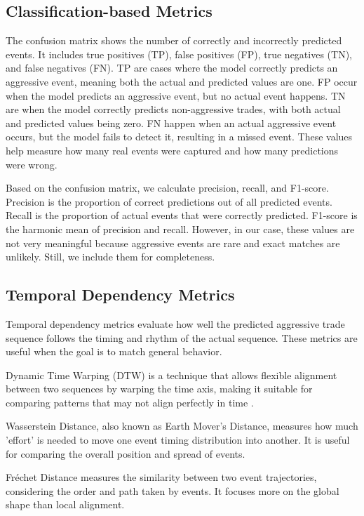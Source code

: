 \subsection{Classification-based Metrics}
The confusion matrix shows the number of correctly and incorrectly predicted events. It includes true positives (TP), false positives (FP), true negatives (TN), and false negatives (FN). TP are cases where the model correctly predicts an aggressive event, meaning both the actual and predicted values are one. FP occur when the model predicts an aggressive event, but no actual event happens. TN are when the model correctly predicts non-aggressive trades, with both actual and predicted values being zero. FN happen when an actual aggressive event occurs, but the model fails to detect it, resulting in a missed event. These values help measure how many real events were captured and how many predictions were wrong.

Based on the confusion matrix, we calculate precision, recall, and F1-score. Precision is the proportion of correct predictions out of all predicted events. Recall is the proportion of actual events that were correctly predicted. F1-score is the harmonic mean of precision and recall. However, in our case, these values are not very meaningful because aggressive events are rare and exact matches are unlikely. Still, we include them for completeness.

\subsection{Temporal Dependency Metrics}
Temporal dependency metrics evaluate how well the predicted aggressive trade sequence follows the timing and rhythm of the actual sequence. These metrics are useful when the goal is to match general behavior.

Dynamic Time Warping (DTW) is a technique that allows flexible alignment between two sequences by warping the time axis, making it suitable for comparing patterns that may not align perfectly in time \citep{muller2007dtw}. 

Wasserstein Distance, also known as Earth Mover's Distance, measures how much 'effort' is needed to move one event timing distribution into another. It is useful for comparing the overall position and spread of events.

Fréchet Distance measures the similarity between two event trajectories, considering the order and path taken by events. It focuses more on the global shape than local alignment.

